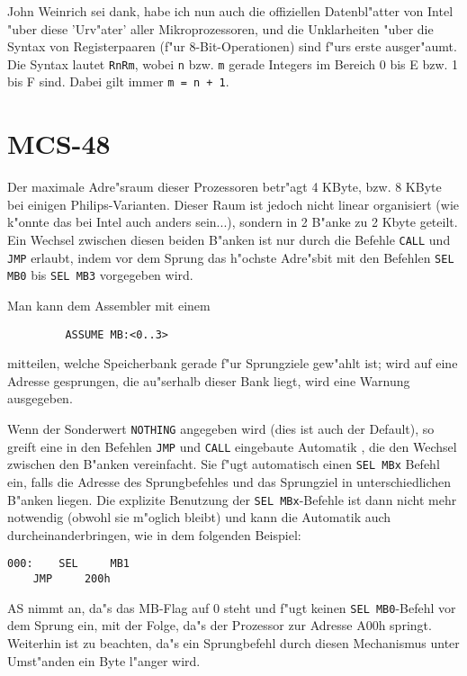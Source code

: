 \documentclass[12pt,a4paper,twoside]{report}
\newcommand{\tty}[1]{{\tt #1}}
\begin{document}
John Weinrich sei dank, habe ich nun auch die offiziellen Datenbl"atter
von Intel "uber diese 'Urv"ater' aller Mikroprozessoren, und die
Unklarheiten "uber die Syntax von Registerpaaren (f"ur 8-Bit-Operationen)
sind f"urs erste ausger"aumt.  Die Syntax lautet \tty{RnRm}, wobei \tty{n}
bzw. \tty{m} gerade Integers im Bereich 0 bis E bzw. 1 bis F sind.  Dabei
gilt immer \tty{m = n + 1}.


\section{MCS-48}

Der maximale Adre"sraum dieser Prozessoren betr"agt 4 KByte, bzw. 8 KByte
bei einigen Philips-Varianten.  Dieser Raum ist jedoch nicht linear organisiert
(wie k"onnte das bei Intel auch anders sein...), sondern in 2 B"anke zu 2
Kbyte geteilt.  Ein Wechsel zwischen diesen beiden B"anken ist nur durch die
Befehle \tty{CALL} und \tty{JMP} erlaubt, indem vor dem Sprung das h"ochste
Adre"sbit mit den Befehlen \tty{SEL MB0} bis \tty{SEL MB3} vorgegeben wird.

Man kann dem Assembler mit einem
\begin{verbatim}
         ASSUME MB:<0..3>
\end{verbatim}
mitteilen, welche Speicherbank gerade f"ur Sprungziele gew"ahlt ist; wird auf
eine Adresse gesprungen, die au"serhalb dieser Bank liegt, wird eine Warnung
ausgegeben.

Wenn der Sonderwert {\tt NOTHING} angegeben wird (dies ist auch der Default), 
so greift eine in den Befehlen \tty{JMP} und \tty{CALL} eingebaute Automatik ,
die den Wechsel zwischen den B"anken vereinfacht.  Sie f"ugt automatisch einen
{\tt SEL MBx} Befehl ein, falls die Adresse des Sprungbefehles und das
Sprungziel in unterschiedlichen B"anken liegen.  Die explizite Benutzung der
\tty{SEL MBx}-Befehle ist dann nicht mehr notwendig (obwohl sie m"oglich
bleibt) und kann die Automatik auch durcheinanderbringen, wie in dem folgenden
Beispiel:
\begin{verbatim}
000:    SEL     MB1
	JMP     200h
\end{verbatim}
AS nimmt an, da"s das MB-Flag auf 0 steht und f"ugt keinen
\tty{SEL MB0}-Befehl vor dem Sprung ein, mit der Folge, da"s der
Prozessor zur Adresse A00h springt.
Weiterhin ist zu beachten, da"s ein Sprungbefehl durch diesen Mechanismus
unter Umst"anden ein Byte l"anger wird.
\end{document}
